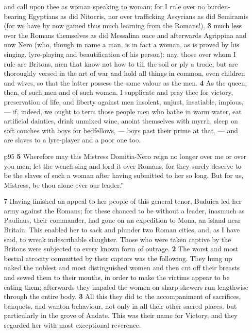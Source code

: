 and call upon thee as woman speaking to woman; for I rule over no burden-bearing Egyptians as did Nitocris, nor over trafficking Assyrians as did Semiramis (for we have by now gained thus much learning from the Romans!), \textbf{3} much less over the Romans themselves as did Messalina once and afterwards Agrippina and now Nero (who, though in name a man, is in fact a woman, as is proved by his singing, lyre-playing and beautification of his person); nay, those over whom I rule are Britons, men that know not how to till the soil or ply a trade, but are thoroughly versed in the art of war and hold all things in common, even children and wives, so that the latter possess the same valour as the men. \textbf{4} As the queen, then, of such men and of such women, I supplicate and pray thee for victory, preservation of life, and liberty against men insolent, unjust, insatiable, impious, \texthebrew{—} if, indeed, we ought to term those people men who bathe in warm water, eat artificial dainties, drink unmixed wine, anoint themselves with myrrh, sleep on soft couches with boys for bedfellows, \texthebrew{—} boys past their prime at that, \texthebrew{—} and are slaves to a lyre-player and a poor one too.

p95 \textbf{5} Wherefore may this Mistress Domitia-Nero reign no longer over me or over you men; let the wench sing and lord it over Romans, for they surely deserve to be the slaves of such a woman after having submitted to her so long. But for us, Mistress, be thou alone ever our leader.''

7 Having finished an appeal to her people of this general tenor, Buduica led her army against the Romans; for these chanced to be without a leader, inasmuch as Paulinus, their commander, had gone on an expedition to Mona, an island near Britain. This enabled her to sack and plunder two Roman cities, and, as I have said, to wreak indescribable slaughter. Those who were taken captive by the Britons were subjected to every known form of outrage. \textbf{2} The worst and most bestial atrocity committed by their captors was the following. They hung up naked the noblest and most distinguished women and then cut off their breasts and sewed them to their mouths, in order to make the victims appear to be eating them; afterwards they impaled the women on sharp skewers run lengthwise through the entire body. \textbf{3} All this they did to the accompaniment of sacrifices, banquets, and wanton behaviour, not only in all their other sacred places, but particularly in the grove of Andate. This was their name for Victory, and they regarded her with most exceptional reverence.

